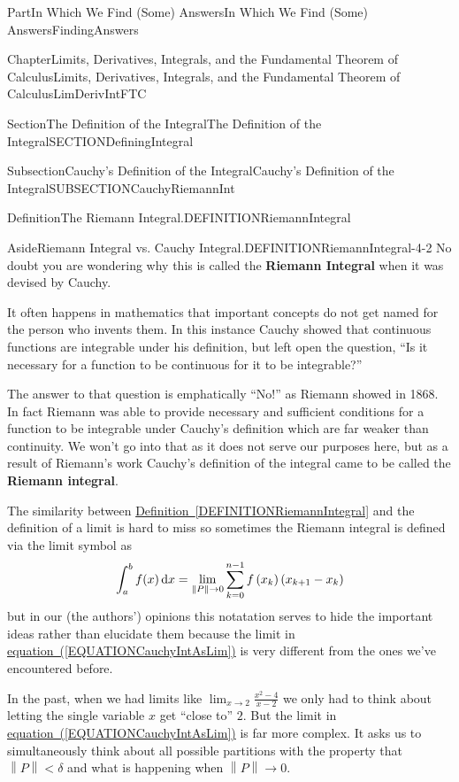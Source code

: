 \documentclass[oneside,10pt,]{book}
\newcommand{\xreffont}{\relax}
\newcommand{\terminology}[1]{\textbf{#1}}
\numberwithin{equation}{part}
\newcommand{\norm}[1]{\left\|#1\right\|}
\newcommand{\dx}[1]{\,{\rm d}#1}
\def\limit#1#2#3{{\displaystyle\lim_{#1\rightarrow #2}#3}}
\def\limitt#1#2#3{{\displaystyle\lim_{#1\rightarrow #2}\textstyle #3}}
\newcommand{\lt}{<}
\begin{document}
\begin{partptx}{Part}{In Which We Find (Some) Answers}{}{In Which We Find (Some) Answers}{}{}{FindingAnswers}
\begin{chapterptx}{Chapter}{Limits, Derivatives, Integrals, and the Fundamental Theorem of Calculus}{}{Limits, Derivatives, Integrals, and the Fundamental Theorem of Calculus}{}{}{LimDerivIntFTC}
\begin{sectionptx}{Section}{The Definition of the Integral}{}{The Definition of the Integral}{}{}{SECTIONDefiningIntegral}
\begin{subsectionptx}{Subsection}{Cauchy's Definition of the Integral}{}{Cauchy's Definition of the Integral}{}{}{SUBSECTIONCauchyRiemannInt}
\begin{definition}{Definition}{The Riemann Integral.}{DEFINITIONRiemannIntegral}
\begin{aside}{Aside}{Riemann Integral vs. Cauchy Integral.}{DEFINITIONRiemannIntegral-4-2}%
No doubt you are wondering why this is called the \terminology{Riemann Integral} when it was devised by Cauchy.%
\par
It often happens in mathematics that important concepts do not get named for the person who invents them. In this instance Cauchy showed that continuous functions are integrable under his definition, but left open the question, ``Is it necessary for a function to be continuous for it to be integrable?''%
\par
The answer to that question is emphatically ``No!'' as Riemann showed in 1868. In fact Riemann was able to provide necessary and sufficient conditions for a function to be integrable under Cauchy's definition which are far weaker than continuity.  We won't go into that as it does not serve our purposes here, but as a result of Riemann's work Cauchy's definition of the integral came to be called the \terminology{Riemann integral}.%
\end{aside}
\end{definition}
The similarity between \hyperref[DEFINITIONRiemannIntegral]{Definition~{\xreffont\ref{DEFINITIONRiemannIntegral}}}  and the definition of a limit is hard to miss so sometimes the Riemann integral is defined via the limit symbol as%
\begin{equation}
\int_a^bf(x)\dx{x} =
\limit{\norm{P}}{0}{\sum^{n-1}_{k=0}{f\left(x_k\right)\left(x_{k+1}-x_k\right)}}\label{EQUATIONCauchyIntAsLim}
\end{equation}
but in our (the authors') opinions this notatation serves to hide the important ideas rather than elucidate them because the limit in \hyperref[EQUATIONCauchyIntAsLim]{equation~({\xreffont\ref{EQUATIONCauchyIntAsLim}})} is very different from the ones we've encountered before.%
\par
In the past, when we had limits like \(\limitt{x}{2}{\frac{x^2-4}{x-2}}\) we only had to think about letting the single variable \(x\) get ``close to'' \(2\). But the limit in \hyperref[EQUATIONCauchyIntAsLim]{equation~({\xreffont\ref{EQUATIONCauchyIntAsLim}})} is far more complex. It asks us to simultaneously think about all possible partitions with the property that \(\norm{P}\lt\delta{}\) and  what is happening when \(\norm{P} \rightarrow 0\).%
\par

\end{subsectionptx}
\end{sectionptx}
\end{chapterptx}
\end{partptx}
\end{document}
